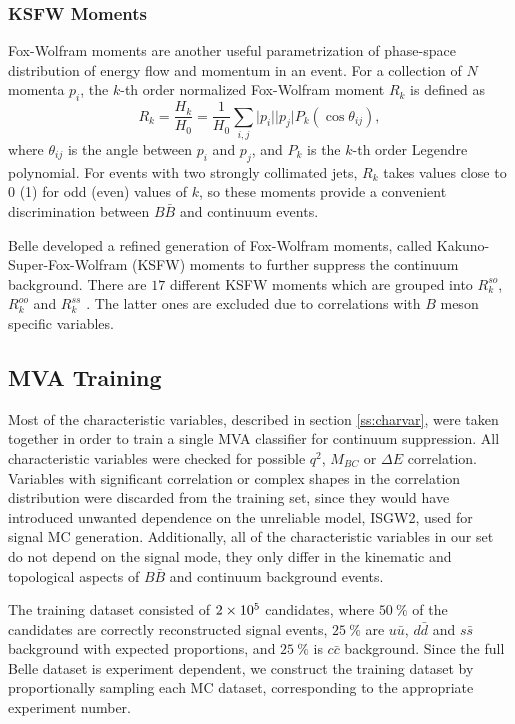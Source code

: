 \subsubsection{KSFW Moments}
Fox-Wolfram moments are another useful parametrization of phase-space distribution of energy flow and momentum in an event. For a collection of $N$ momenta $p_i$, the $k$-th order normalized Fox-Wolfram moment $R_k$ is defined as
\begin{equation}
R_k = \frac{H_k}{H_0} = \frac{1}{H_0} \sum_{i,j} \vert p_i \vert \vert p_j \vert P_k(\cos \theta_{ij}),
\end{equation}
where $\theta_{ij}$ is the angle between $p_i$ and $p_j$, and $P_k$ is the $k$-th order Legendre polynomial. For events with two strongly collimated jets, $R_k$ takes values close to 0 (1) for odd (even) values of $k$, so these moments provide a convenient discrimination between $B \bar B$ and continuum events.

Belle developed a refined generation of Fox-Wolfram moments, called Kakuno-Super-Fox-Wolfram (KSFW) moments to further suppress the continuum background. There are $17$  different KSFW moments which are grouped into $R^{so}_k$, $R^{oo}_k$ and $R^{ss}_k$ \cite{bevan2014physics}. The latter ones are excluded due to correlations with $B$ meson specific variables.

\subsection{MVA Training}
\label{ss:qqmva}
Most of the characteristic variables, described in section \ref{ss:charvar}, were taken together in order to train a single MVA classifier for continuum suppression. All characteristic variables were checked for possible $q^2$, $M_{BC}$ or $\Delta E$ correlation. Variables with significant correlation or complex shapes in the correlation distribution were discarded from the training set, since they would have introduced unwanted dependence on the unreliable model, ISGW2, used for signal MC generation. Additionally, all of the characteristic variables in our set do not depend on the signal mode, they only differ in the kinematic and topological aspects of $B \bar B$ and continuum background events.

The training dataset consisted of $2\times 10^{5}$ candidates, where $50~\%$ of the candidates are correctly reconstructed signal events, $25~\%$ are $u \bar u$, $d \bar d$ and $s \bar s$ background with expected proportions, and $25~\%$ is $c \bar c$ background. Since the full Belle dataset is experiment dependent, we construct the training dataset by proportionally sampling each MC dataset, corresponding to the appropriate experiment number.

